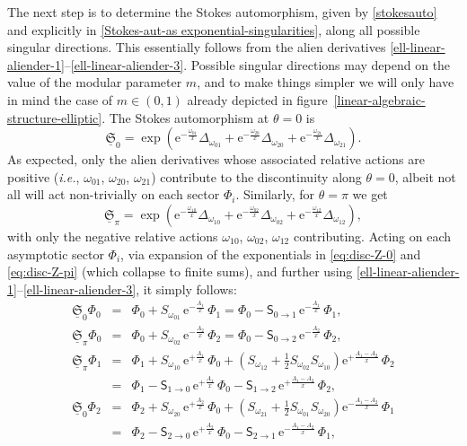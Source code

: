 \documentclass[11pt,a4paper]{article}
\newcommand{\be}{\begin{equation}}
\newcommand{\ee}{\end{equation}}
\newcommand{\rme}{{\mathrm{e}}}
\begin{document}
The next step is to determine the Stokes automorphism, given by \eqref{stokesauto} and explicitly in \eqref{Stokes-aut-as exponential-singularities}, along all possible singular directions. This essentially follows from the alien derivatives \eqref{ell-linear-aliender-1}--\eqref{ell-linear-aliender-3}. Possible singular directions may depend on the value of the modular parameter $m$, and to make things simpler we will only have in mind the case of $m\in(0,1)$ already depicted in figure~\ref{linear-algebraic-structure-elliptic}. The Stokes automorphism at $\theta=0$ is
%
\be
\label{eq:disc-Z-0}
\underline{\mathfrak{S}}_0 = \exp \left( \rme^{-\frac{\omega_{01}}{x}} \Delta_{\omega_{01}} + \rme^{-\frac{\omega_{20}}{x}} \Delta_{\omega_{20}} + \rme^{-\frac{\omega_{21}}{x}} \Delta_{\omega_{21}} \right).
\ee
%
\noindent
As expected, only the alien derivatives whose associated relative actions are positive (\textit{i.e.}, $\omega_{01}$, $\omega_{20}$, $\omega_{21}$) contribute to the discontinuity along $\theta=0$, albeit not all will act non-trivially on each sector $\Phi_i$. Similarly, for $\theta=\pi$ we get
%
\be
\label{eq:disc-Z-pi}
\underline{\mathfrak{S}}_\pi = \exp \left( \rme^{-\frac{\omega_{10}}{x}} \Delta_{\omega_{10}} + \rme^{-\frac{\omega_{02}}{x}} \Delta_{\omega_{02}}+ \rme^{-\frac{\omega_{12}}{x}} \Delta_{\omega_{12}} \right),
\ee
%
\noindent
with only the negative relative actions $\omega_{10}$, $\omega_{02}$, $\omega_{12}$ contributing. Acting on each asymptotic sector $\Phi_i$, via expansion of the exponentials in \eqref{eq:disc-Z-0} and \eqref{eq:disc-Z-pi} (which collapse to finite sums), and further using \eqref{ell-linear-aliender-1}--\eqref{ell-linear-aliender-3}, it simply follows:
%
\begin{eqnarray}
\label{ell-linear-Stokes-00}
\underline{\mathfrak{S}}_0 \Phi_0 &=& \Phi_0 + S_{\omega_{01}}\, \mathrm{e}^{-\frac{A_1}{x}}\, \Phi_1 = \Phi_0 - \mathsf{S}_{0\to 1}\, \mathrm{e}^{-\frac{A_1}{x}}\, \Phi_1, \\
\label{ell-linear-Stokes-pi0}
\underline{\mathfrak{S}}_{\pi} \Phi_0 &=& \Phi_0 + S_{\omega_{02}}\, \mathrm{e}^{-\frac{A_2}{x}}\, \Phi_2 = \Phi_0 - \mathsf{S}_{0\to 2}\, \mathrm{e}^{-\frac{A_2}{x}}\, \Phi_2, \\
\label{ell-linear-Stokes-pi1}
\underline{\mathfrak{S}}_{\pi} \Phi_1 &=& \Phi_1 + S_{\omega_{10}}\, \mathrm{e}^{+\frac{A_1}{x}}\, \Phi_0 + \left( S_{\omega_{12}} + \frac{1}{2} S_{\omega_{02}} S_{\omega_{10}} \right) \mathrm{e}^{+\frac{A_1-A_2}{x}}\, \Phi_2 \nonumber \\
&=& \Phi_1 - \mathsf{S}_{1\to 0}\, \mathrm{e}^{+\frac{A_1}{x}}\, \Phi_0 - \mathsf{S}_{1\to 2}\, \mathrm{e}^{+\frac{A_1-A_2}{ x}}\, \Phi_2, \\
\label{ell-linear-Stokes-02}
\underline{\mathfrak{S}}_0 \Phi_2 &=& \Phi_2 + S_{\omega_{20}}\, \mathrm{e}^{+\frac{A_2}{x}}\, \Phi_0 + \left( S_{\omega_{21}} + \frac{1}{2} S_{\omega_{01}} S_{\omega_{20}} \right) \mathrm{e}^{-\frac{A_1-A_2}{x}}\, \Phi_1 \nonumber \\
&=& \Phi_2 - \mathsf{S}_{2\to 0}\, \mathrm{e}^{+\frac{A_2}{x}}\, \Phi_0 - \mathsf{S}_{2\to 1}\, \mathrm{e}^{-\frac{A_1-A_2}{x}}\, \Phi_1,
\end{eqnarray}
\end{document}
